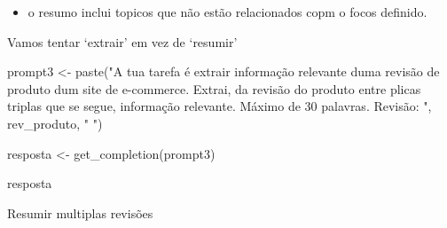 \documentclass[
  letterpaper,
  paper=6in:9in,
  pagesize=pdftex,
  headinclude=on,
  footinclude=on,
  12pt]{scrbook}
\newenvironment{Shaded}{\begin{snugshade}}{\end{snugshade}}
\newcommand{\FunctionTok}[1]{\textcolor[rgb]{0.28,0.35,0.67}{#1}}
\newcommand{\NormalTok}[1]{\textcolor[rgb]{0.00,0.23,0.31}{#1}}
\newcommand{\OtherTok}[1]{\textcolor[rgb]{0.00,0.23,0.31}{#1}}
\newcommand{\StringTok}[1]{\textcolor[rgb]{0.13,0.47,0.30}{#1}}
\providecommand{\tightlist}{%
  \setlength{\itemsep}{0pt}\setlength{\parskip}{0pt}}\usepackage{longtable,booktabs,array}
\begin{document}
\begin{itemize}
\tightlist
\item
  o resumo inclui topicos que não estão relacionados copm o focos
  definido.
\end{itemize}

Vamos tentar `extrair' em vez de `resumir'

\begin{Shaded}
\begin{Highlighting}[]
\NormalTok{prompt3 }\OtherTok{\textless{}{-}} \FunctionTok{paste}\NormalTok{(}\StringTok{"A tua tarefa é extrair informação relevante duma revisão de produto dum site de e{-}commerce.}
\StringTok{                 Extrai, da revisão do produto entre plicas triplas que se segue, }
\StringTok{                 informação relevante. Máximo de 30 palavras.}
\StringTok{                 Revisão: \textquotesingle{}\textquotesingle{}\textquotesingle{} "}\NormalTok{, rev\_produto, }\StringTok{" \textquotesingle{}\textquotesingle{}\textquotesingle{} "}\NormalTok{)}

\NormalTok{resposta }\OtherTok{\textless{}{-}} \FunctionTok{get\_completion}\NormalTok{(prompt3)}

\NormalTok{resposta}
\end{Highlighting}
\end{Shaded}

Resumir multiplas revisões
\end{document}
